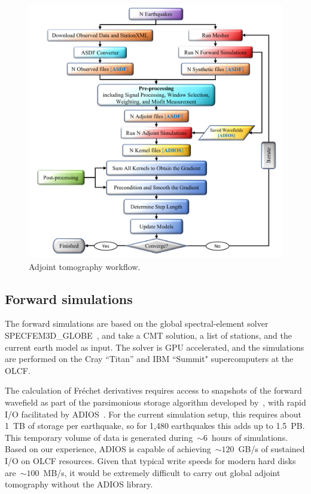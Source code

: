 \documentclass[extra,mreferee]{gji}
\begin{document}
\begin{figure}
  \centering
  \includegraphics[width=\textwidth]{figures/adjoint_workflow_6.pdf}
  \caption{\small{Adjoint tomography workflow.}}
  \label{fig:adjoint_workflow}
\end{figure}

\subsection{Forward simulations}

The forward simulations are based on the global spectral-element solver
SPECFEM3D\_GLOBE~\citep{KoTr02a,KoTr02a}, and take a CMT solution, a list
of stations, and the current earth model as input.
The solver is GPU accelerated, and the simulations are performed on the Cray ``Titan'' and IBM ``Summit" supercomputers
at the OLCF.

The calculation of Fr\'echet derivatives requires
access to snapshots of the forward wavefield as part of the parsimonious storage
algorithm developed by~\cite{KoXiBoPeSaLiTr16},
with rapid I/O facilitated by ADIOS~\citep{liu2014hello}.
For the current simulation setup,
this requires about 1~TB of storage per earthquake,
so for 1,480 earthquakes this adds up to 1.5~PB.
This temporary volume of data is generated during~$\sim6$~hours of simulations.
Based on our experience, ADIOS is capable of achieving~$\sim120$~GB/s
of sustained I/O on OLCF resources.
Given that typical write speeds for modern hard disks are~$\sim100$~MB/s,
it would be extremely difficult to carry out global adjoint tomography without the ADIOS library.
\end{document}
